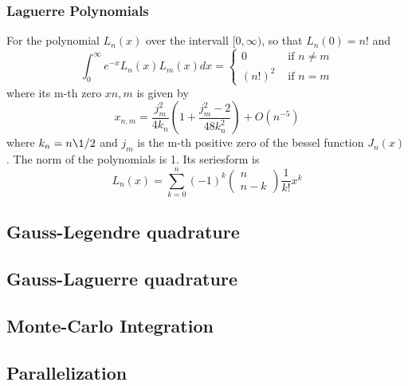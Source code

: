\documentclass[%
reprint,
amsmath,amssymb,
aps,
]{revtex4-1}
\begin{document}
\subsubsection{Laguerre Polynomials}
For the polynomial $L_n(x)$ over the intervall $[0,\infty)$, so that $L_n(0) = n!$ and
\begin{equation}
\int_{0}^{\infty} e^{-x} L_{n}(x) L_{m}(x) d x=\left\{\begin{array}{ll}{0} & {\text { if } n \neq m} \\ {(n !)^{2}} & {\text { if } n=m}\end{array}\right.
\end{equation}
where its m-th zero $xn,m$ is given by 
\begin{equation}
x_{n, m}=\frac{j_{m}^{2}}{4 k_{n}}\left(1+\frac{j_{m}^{2}-2}{48 k_{n}^{2}}\right)+O\left(n^{-5}\right)
\end{equation}
where $k_n = n\1/2$ and $j_m$ is the m-th positive zero of the bessel function $J_n(x)$. The norm of the polynomials is 1. 
Its seriesform is
\begin{equation}
L_{n}(x)=\sum_{k=0}^{n}(-1)^{k}\left(\begin{array}{c}{n} \\ {n-k}\end{array}\right) \frac{1}{k !} x^{k}
\end{equation}



\subsection{Gauss-Legendre quadrature}
\subsection{Gauss-Laguerre quadrature}
\subsection{Monte-Carlo Integration}
\subsection{Parallelization}
\end{document}
